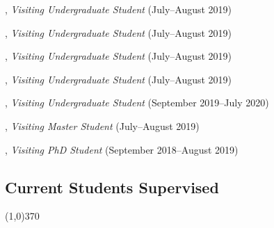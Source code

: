 \documentclass[10pt]{article}
\newenvironment{myindentpar}[1]%
{\begin{list}{}%
         {\setlength{\leftmargin}{#1}}%
         \item[]%
}
{\end{list}}
\newcounter{list}
\begin{document}
\begin{myindentpar}{0.75cm}
\hspace{-0.75cm}{\bf Ms. Mengxia Yu}, \textit{Visiting Undergraduate Student} (July--August 2019)

\hspace{-0.75cm}{\bf Ms. Kaifeng Yu}, \textit{Visiting Undergraduate Student} (July--August 2019)

\hspace{-0.75cm}{\bf Zhihan Zhang}, \textit{Visiting Undergraduate Student} (July--August 2019)

\hspace{-0.75cm}{\bf Ms. Yang Zhou}, \textit{Visiting Undergraduate Student} (July--August 2019)

\hspace{-0.75cm}{\bf Zaitang Li}, \textit{Visiting Undergraduate Student} (September 2019--July 2020)

\hspace{-0.75cm}{\bf Zijian Hu}, \textit{Visiting Master Student} (July--August 2019)

\hspace{-0.75cm}{\bf Tianwen Jiang}, \textit{Visiting PhD Student} (September 2018--August 2019)

\end{myindentpar}

\subsection{\sc Current Students Supervised}
\vspace{-0.4cm} \line(1,0){370} \vspace{-0.1cm}
\end{document}
